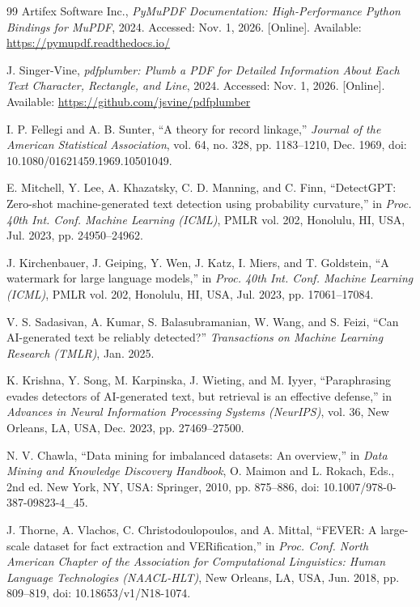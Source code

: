 \begin{thebibliography}{99}
Artifex Software Inc., \textit{PyMuPDF Documentation: High-Performance Python Bindings for MuPDF}, 2024. Accessed: Nov. 1, 2026. [Online]. Available: \url{https://pymupdf.readthedocs.io/}

J. Singer-Vine, \textit{pdfplumber: Plumb a PDF for Detailed Information About Each Text Character, Rectangle, and Line}, 2024. Accessed: Nov. 1, 2026. [Online]. Available: \url{https://github.com/jsvine/pdfplumber}

I. P. Fellegi and A. B. Sunter, ``A theory for record linkage,'' \textit{Journal of the American Statistical Association}, vol. 64, no. 328, pp. 1183--1210, Dec. 1969, doi: 10.1080/01621459.1969.10501049.

E. Mitchell, Y. Lee, A. Khazatsky, C. D. Manning, and C. Finn, ``DetectGPT: Zero-shot machine-generated text detection using probability curvature,'' in \textit{Proc. 40th Int. Conf. Machine Learning (ICML)}, PMLR vol. 202, Honolulu, HI, USA, Jul. 2023, pp. 24950--24962.

J. Kirchenbauer, J. Geiping, Y. Wen, J. Katz, I. Miers, and T. Goldstein, ``A watermark for large language models,'' in \textit{Proc. 40th Int. Conf. Machine Learning (ICML)}, PMLR vol. 202, Honolulu, HI, USA, Jul. 2023, pp. 17061--17084.

V. S. Sadasivan, A. Kumar, S. Balasubramanian, W. Wang, and S. Feizi, ``Can AI-generated text be reliably detected?'' \textit{Transactions on Machine Learning Research (TMLR)}, Jan. 2025.

K. Krishna, Y. Song, M. Karpinska, J. Wieting, and M. Iyyer, ``Paraphrasing evades detectors of AI-generated text, but retrieval is an effective defense,'' in \textit{Advances in Neural Information Processing Systems (NeurIPS)}, vol. 36, New Orleans, LA, USA, Dec. 2023, pp. 27469--27500.

N. V. Chawla, ``Data mining for imbalanced datasets: An overview,'' in \textit{Data Mining and Knowledge Discovery Handbook}, O. Maimon and L. Rokach, Eds., 2nd ed. New York, NY, USA: Springer, 2010, pp. 875--886, doi: 10.1007/978-0-387-09823-4\_45.

J. Thorne, A. Vlachos, C. Christodoulopoulos, and A. Mittal, ``FEVER: A large-scale dataset for fact extraction and VERification,'' in \textit{Proc. Conf. North American Chapter of the Association for Computational Linguistics: Human Language Technologies (NAACL-HLT)}, New Orleans, LA, USA, Jun. 2018, pp. 809--819, doi: 10.18653/v1/N18-1074.


\end{thebibliography}

